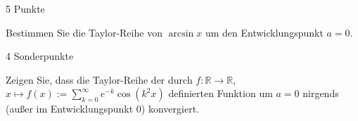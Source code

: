 \documentclass{problemset}
\begin{document}
\begin{problem}{5 Punkte}

Bestimmen Sie die Taylor-Reihe von $\arcsin x$ um den Entwicklungspunkt $a =
    0$.
\end{problem}

\begin{problem}{4 Sonderpunkte}

Zeigen Sie, dass die Taylor-Reihe der durch $f : \mathbb{R} \to \mathbb{R}$, $x
    \mapsto f(x) := \sum\limits_{k=0}^{\infty} e^{-k} \cos(k^2x)$ definierten
Funktion um $a = 0$ nirgends (außer im Entwicklungspunkt $0$) konvergiert.
\end{problem}
\end{document}
